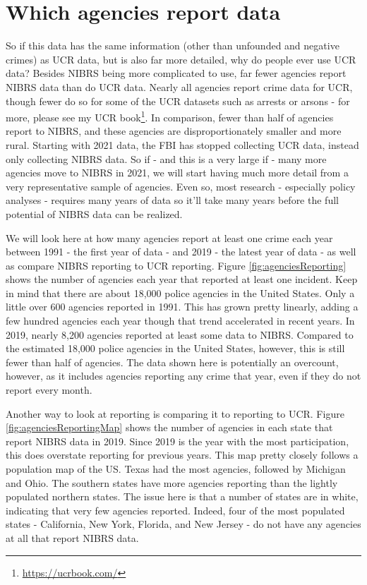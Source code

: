 \documentclass[
]{krantz}
\renewcommand{\href}[2]{#2\footnote{\url{#1}}}
\begin{document}
\section{Which agencies report
data}\label{which-agencies-report-data}

So if this data has the same information (other than
unfounded and negative crimes) as UCR data, but is also far
more detailed, why do people ever use UCR data? Besides
NIBRS being more complicated to use, far fewer agencies
report NIBRS data than do UCR data. Nearly all agencies
report crime data for UCR, though fewer do so for some of
the UCR datasets such as arrests or arsons - for more,
please see my \href{https://ucrbook.com/}{UCR book}. In
comparison, fewer than half of agencies report to NIBRS, and
these agencies are disproportionately smaller and more
rural. Starting with 2021 data, the FBI has stopped
collecting UCR data, instead only collecting NIBRS data. So
if - and this is a very large if - many more agencies move
to NIBRS in 2021, we will start having much more detail from
a very representative sample of agencies. Even so, most
research - especially policy analyses - requires many years
of data so it'll take many years before the full potential
of NIBRS data can be realized.

We will look here at how many agencies report at least one
crime each year between 1991 - the first year of data - and
2019 - the latest year of data - as well as compare NIBRS
reporting to UCR reporting. Figure
\ref{fig:agenciesReporting} shows the number of agencies
each year that reported at least one incident. Keep in mind
that there are about 18,000 police agencies in the United
States. Only a little over 600 agencies reported in 1991.
This has grown pretty linearly, adding a few hundred
agencies each year though that trend accelerated in recent
years. In 2019, nearly 8,200 agencies reported at least some
data to NIBRS. Compared to the estimated 18,000 police
agencies in the United States, however, this is still fewer
than half of agencies. The data shown here is potentially an
overcount, however, as it includes agencies reporting any
crime that year, even if they do not report every month.

Another way to look at reporting is comparing it to
reporting to UCR. Figure \ref{fig:agenciesReportingMap}
shows the number of agencies in each state that report NIBRS
data in 2019. Since 2019 is the year with the most
participation, this does overstate reporting for previous
years. This map pretty closely follows a population map of
the US. Texas had the most agencies, followed by Michigan
and Ohio. The southern states have more agencies reporting
than the lightly populated northern states. The issue here
is that a number of states are in white, indicating that
very few agencies reported. Indeed, four of the most
populated states - California, New York, Florida, and New
Jersey - do not have any agencies at all that report NIBRS
data.
\end{document}
